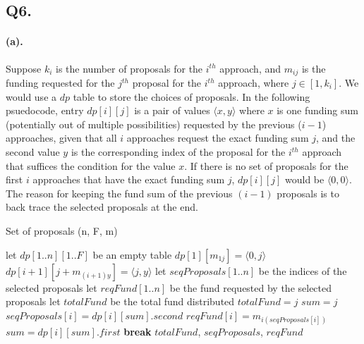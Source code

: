 \documentclass[12pt]{article}
\begin{document}
\subsection*{Q6.}
\paragraph{(a).} Suppose \(k_i\) is the number of proposals for the \(i^{th}\) approach, and \(m_{ij}\) is the funding requested for the \(j^{th}\) proposal for the \(i^{th}\) approach, where \(j \in [1, k_i]\). We would use a \(dp\) table to store the choices of proposals. In the following psuedocode, entry \(dp[i][j]\) is a pair of values \(\langle x,y\rangle\) where \(x\) is one funding sum (potentially out of multiple possibilities) requested by the previous (\(i-1\)) approaches, given that all \(i\) approaches request the exact funding sum \(j\), and the second value \(y\) is the corresponding index of the proposal for the \(i^{th}\) approach that suffices the condition for the value \(x\). If there is no set of proposals for the first \(i\) approaches that have the exact funding sum \(j\), \(dp[i][j]\) would be \(\langle 0,0\rangle\). The reason for keeping the fund sum of the previous \((i-1)\) proposals is to back trace the selected proposals at the end.
\begin{algorithm}[H]
     \caption{Set of proposals (n, F, m)}
     \begin{algorithmic}[1]
          \State let \(dp[1..n][1..F]\) be an empty table 
               \State \(dp[1][m_{1j}] = \langle 0,j \rangle\) 
          \EndFor
                                   \State \(dp[i+1][j+m_{(i+1)y}] = \langle j,y \rangle\)
                              \EndIf
                         \EndFor
                    \EndIf
               \EndFor
          \EndFor
          \State let \(seqProposals[1..n]\) be the indices of the selected proposals
          \State let \(reqFund[1..n]\) be the fund requested by the selected proposals
          \State let \(totalFund\) be the total fund distributed
                
                    \State \(totalFund = j\)
                    \State \(sum = j\)
                     
                         \State \(seqProposals[i] = dp[i][sum].second\)
                         \State \(reqFund[i] = m_{i(seqProposals[i])}\)
                         \State \(sum = dp[i][sum].first\)
                    \EndFor
                    \State \textbf{break}
               \EndIf
          \EndFor
          \State \Return \(totalFund\), \(seqProposals\), \(reqFund\)
     \end{algorithmic}
\end{algorithm}
\end{document}
